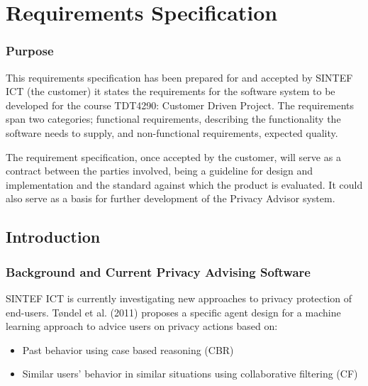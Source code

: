  

\chapter{Requirements Specification}\label{reqspec}

\minitoc

\subsection*{Purpose}
This requirements specification has been prepared for and accepted by SINTEF ICT (the customer) it states the requirements for the software system to be developed for the course TDT4290: Customer Driven Project. The requirements span two categories; functional requirements, describing the functionality the software needs to supply, and non-functional requirements, expected quality.

The requirement specification, once accepted by the customer, will serve as a contract between the parties involved, being a guideline for design and implementation and the standard against which the product is evaluated. It could also serve as a basis for further development of the Privacy Advisor system.

\section{Introduction}
\subsection{Background and Current Privacy Advising Software}
SINTEF ICT is currently investigating new approaches to privacy protection of end-users. T{\o}ndel et al. (2011) proposes a specific agent design for a machine learning approach to advice users on privacy actions based on:

\begin{itemize}
\item Past behavior using case based reasoning (CBR)
\item Similar users' behavior in similar situations using collaborative filtering (CF)
\end{itemize}

